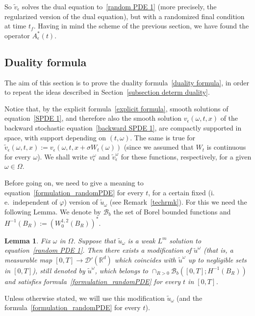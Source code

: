 \documentclass[a4paper,10pt]{article}
\newtheorem{lemma}[theorem]{Lemma}
\newcommand{\mr}{\mathbb{R}}
\newcommand{\mc}{\mathcal}
\newcommand{\td}{\tilde}
\newcommand{\eps}{\epsilon}
\begin{document}
So $\widetilde{v}_{\epsilon}$ solves the dual equation to~\eqref{random PDE 1} (more precisely, the regularized version of the dual equation), but with a randomized final condition at time $t_{f}$. Having in mind the scheme of the previous section, we have found the operator $A^*_\eps(t)$.

\subsection{Duality formula}

The aim of this section is to prove the duality formula~\eqref{duality formula}, in order
to repeat the ideas described in Section~\ref{subsection determ duality}.

Notice that, by the explicit formula~\eqref{explicit formula}, smooth
solutions of equation~\eqref{SPDE 1}, and therefore also the smooth solution
$v_{\epsilon}(\omega,t,x)$ of the backward stochastic equation~\eqref{backward SPDE 1}, are compactly supported in space, with support depending
on $(t,\omega)$. The same is true for $\widetilde{v}_{\epsilon
}(\omega,t,x)  :=v_{\epsilon}(\omega,t,x+\sigma W_{t}(\omega))$ (since we assumed that $W_{t}$ is continuous for every $\omega$). We shall write $v_{\epsilon}^\omega$ and
$\widetilde{v}_{\epsilon}^\omega$ for these functions,
respectively, for a given $\omega\in\Omega$.

Before going on, we need to give a meaning to equation~\eqref{formulation_randomPDE} for every $t$, for a certain fixed (i.\,e.\ independent of $\varphi$) version of $\td{u}_\omega$ (see Remark~\ref{techrmk}). For this we need the following Lemma. We denote by $\mc{B}_b$ the set of Borel bounded functions and $H^{-1}(B_R):=(W^{1,2}_0(B_R))^*$.

\begin{lemma}\label{technicality}
Fix $\omega$ in $\Omega$. Suppose that $\td{u}_\omega$ is a weak $L^m$ solution to equation~\eqref{random PDE 1}. Then there exists a modification of $\td{u}^\omega$ (that is, a measurable map $[0,T]\rightarrow\mc{D}'(\mr^d)$ which coincides with $\td{u}^\omega$ up to negligible sets in $[0,T]$), still denoted by $\td{u}^\omega$, which belongs to $\cap_{R>0}\mc{B}_b([0,T];H^{-1}(B_R))$ and satisfies formula~\eqref{formulation_randomPDE} for every $t$ in $[0,T]$.
\end{lemma}

Unless otherwise stated, we will use this modification $\td{u}_\omega$ (and the formula~\eqref{formulation_randomPDE} for every $t$).
\end{document}
